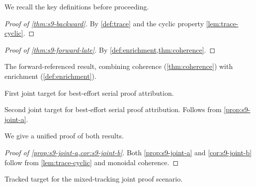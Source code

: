 \documentclass{article}
\numberwithin{equation}{section}
\begin{document}
We recall the key definitions before proceeding.

\begin{proof}[Proof of \cref{thm:s9-backward}]
By \cref{def:trace} and the cyclic property \cref{lem:trace-cyclic}.
\end{proof}

\begin{proof}[Proof of \cref{thm:s9-forward-late}]
By \cref{def:enrichment,thm:coherence}.
\end{proof}

\begin{theorem}\label{thm:s9-forward-late}
The forward-referenced result, combining coherence (\cref{thm:coherence})
with enrichment (\cref{def:enrichment}).
\end{theorem}

\begin{proposition}\label{prop:s9-joint-a}
First joint target for best-effort serial proof attribution.
\end{proposition}

\begin{corollary}\label{cor:s9-joint-b}
Second joint target for best-effort serial proof attribution.
Follows from \cref{prop:s9-joint-a}.
\end{corollary}

We give a unified proof of both results.

\begin{proof}[Proof of \cref{prop:s9-joint-a,cor:s9-joint-b}]
Both \cref{prop:s9-joint-a} and \cref{cor:s9-joint-b} follow from
\cref{lem:trace-cyclic} and monoidal coherence.
\end{proof}

\begin{lemma}\label{lem:s9-mixed}
Tracked target for the mixed-tracking joint proof scenario.
\end{lemma}
\end{document}
